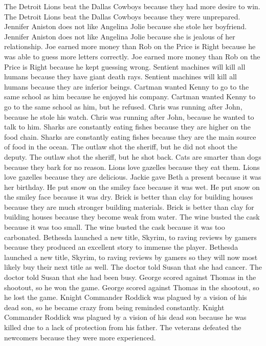 \documentclass{article}
\begin{document}
\begin{enumerate}
The Detroit Lions beat the Dallas Cowboys because they had more desire to win.
The Detroit Lions beat the Dallas Cowboys because they were unprepared.
Jennifer Aniston does not like Angelina Jolie because she stole her boyfriend.
Jennifer Aniston does not like Angelina Jolie because she is jealous of her relationship.
Joe earned more money than Rob on the Price is Right because he was able to guess more letters correctly.
Joe earned more money than Rob on the Price is Right because he kept guessing wrong.
Sentient machines will kill all humans because they have giant death rays.
Sentient machines will kill all humans because they are inferior beings.
Cartman wanted Kenny to go to the same school as him because he enjoyed his company.
Cartman wanted Kenny to go to the same school as him, but he refused.
Chris was running after John, because he stole his watch.
Chris was running after John, because he wanted to talk to him.
Sharks are constantly eating fishes because they are higher on the food chain.
Sharks are constantly eating fishes because they are the main source of food in the ocean.
The outlaw shot the sheriff, but he did not shoot the deputy.
The outlaw shot the sheriff, but he shot back.
Cats are smarter than dogs because they bark for no reason.
Lions love gazelles because they eat them.
Lions love gazelles because they are delicious.
Jackie gave Beth a present because it was her birthday.
He put snow on the smiley face because it was wet.
He put snow on the smiley face because it was dry.
Brick is better than clay for building houses because they are much stronger building materials.
Brick is better than clay for building houses because they become weak from water.
The wine busted the cask because it was too small.
The wine busted the cask because it was too carbonated.
Bethesda launched a new title, Skyrim, to raving reviews by gamers because they produced an excellent story to immense the player.
Bethesda launched a new title, Skyrim, to raving reviews by gamers so they will now most likely buy their next title as well.
The doctor told Susan that she had cancer.
The doctor told Susan that she had been busy.
George scored against Thomas in the shootout, so he won the game.
George scored against Thomas in the shootout, so he lost the game.
Knight Commander Roddick was plagued by a vision of his dead son, so he became crazy from being reminded constantly.
Knight Commander Roddick was plagued by a vision of his dead son because he was killed due to a lack of protection from his father.
The veterans defeated the newcomers because they were more experienced.

\end{enumerate}
\end{document}
